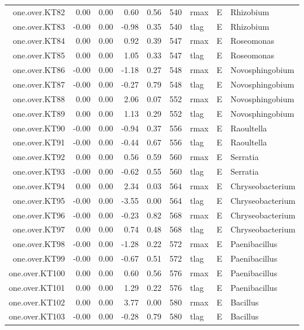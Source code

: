 \begin{table}[ht]
\begin{tabular}{rrrrrrlll}
  one.over.KT82 & 0.00 & 0.00 & 0.60 & 0.56 & 540 & rmax & E & Rhizobium \\ 
  one.over.KT83 & -0.00 & 0.00 & -0.98 & 0.35 & 540 & tlag & E & Rhizobium \\ 
  one.over.KT84 & 0.00 & 0.00 & 0.92 & 0.39 & 547 & rmax & E & Roseomonas \\ 
  one.over.KT85 & 0.00 & 0.00 & 1.05 & 0.33 & 547 & tlag & E & Roseomonas \\ 
  one.over.KT86 & -0.00 & 0.00 & -1.18 & 0.27 & 548 & rmax & E & Novosphingobium \\ 
  one.over.KT87 & -0.00 & 0.00 & -0.27 & 0.79 & 548 & tlag & E & Novosphingobium \\ 
  one.over.KT88 & 0.00 & 0.00 & 2.06 & 0.07 & 552 & rmax & E & Novosphingobium \\ 
  one.over.KT89 & 0.00 & 0.00 & 1.13 & 0.29 & 552 & tlag & E & Novosphingobium \\ 
  one.over.KT90 & -0.00 & 0.00 & -0.94 & 0.37 & 556 & rmax & E & Raoultella \\ 
  one.over.KT91 & -0.00 & 0.00 & -0.44 & 0.67 & 556 & tlag & E & Raoultella \\ 
  one.over.KT92 & 0.00 & 0.00 & 0.56 & 0.59 & 560 & rmax & E & Serratia \\ 
  one.over.KT93 & -0.00 & 0.00 & -0.62 & 0.55 & 560 & tlag & E & Serratia \\ 
  one.over.KT94 & 0.00 & 0.00 & 2.34 & 0.03 & 564 & rmax & E & Chryseobacterium \\ 
  one.over.KT95 & -0.00 & 0.00 & -3.55 & 0.00 & 564 & tlag & E & Chryseobacterium \\ 
  one.over.KT96 & -0.00 & 0.00 & -0.23 & 0.82 & 568 & rmax & E & Chryseobacterium \\ 
  one.over.KT97 & 0.00 & 0.00 & 0.74 & 0.48 & 568 & tlag & E & Chryseobacterium \\ 
  one.over.KT98 & -0.00 & 0.00 & -1.28 & 0.22 & 572 & rmax & E & Paenibacillus \\ 
  one.over.KT99 & -0.00 & 0.00 & -0.67 & 0.51 & 572 & tlag & E & Paenibacillus \\ 
  one.over.KT100 & 0.00 & 0.00 & 0.60 & 0.56 & 576 & rmax & E & Paenibacillus \\ 
  one.over.KT101 & 0.00 & 0.00 & 1.29 & 0.22 & 576 & tlag & E & Paenibacillus \\ 
  one.over.KT102 & 0.00 & 0.00 & 3.77 & 0.00 & 580 & rmax & E & Bacillus \\ 
  one.over.KT103 & -0.00 & 0.00 & -0.28 & 0.79 & 580 & tlag & E & Bacillus \\ 
   \hline
\end{tabular}
\end{table}

